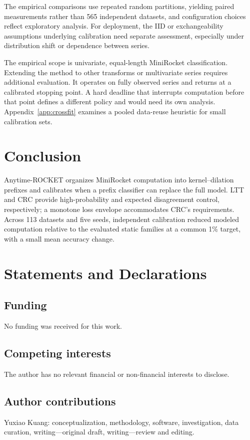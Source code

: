 \documentclass[pdflatex,sn-basic,Numbered]{sn-jnl}
\begin{document}
The empirical comparisons use repeated random partitions, yielding paired measurements rather than 565 independent datasets, and configuration choices reflect exploratory analysis. For deployment, the IID or exchangeability assumptions underlying calibration need separate assessment, especially under distribution shift or dependence between series.

The empirical scope is univariate, equal-length MiniRocket classification. Extending the method to other transforms or multivariate series requires additional evaluation. It operates on fully observed series and returns at a calibrated stopping point. A hard deadline that interrupts computation before that point defines a different policy and would need its own analysis. Appendix~\ref{app:crossfit} examines a pooled data-reuse heuristic for small calibration sets.

\section{Conclusion}
Anytime-ROCKET organizes MiniRocket computation into kernel--dilation prefixes and calibrates when a prefix classifier can replace the full model. LTT and CRC provide high-probability and expected disagreement control, respectively; a monotone loss envelope accommodates CRC's requirements. Across 113 datasets and five seeds, independent calibration reduced modeled computation relative to the evaluated static families at a common 1\% target, with a small mean accuracy change.

\section*{Statements and Declarations}
\subsection*{Funding}
No funding was received for this work.
\subsection*{Competing interests}
The author has no relevant financial or non-financial interests to disclose.
\subsection*{Author contributions}
Yuxiao Kuang: conceptualization, methodology, software, investigation, data curation, writing---original draft, writing---review and editing.
\end{document}
